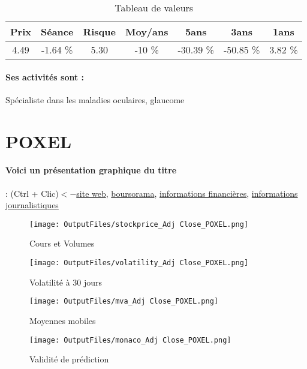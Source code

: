 \documentclass[11pt,a4paper]{report}%
\begin{document}
\begin{table}[H]
  \centering
    \begin{tabular}{|c|c|c|c|c|c|c|}
    \hline
    Prix & Séance & Risque  & Moy/ans & 5ans & 3ans & 1ans \\
    \hline
    4.49 &    -1.64 \%    & 5.30 & -10 \% & -30.39 \% & -50.85 \% & 3.82 \% \\
    \hline
    \end{tabular}%
        \label{tab:table_NICOX}%
      \caption{Tableau de valeurs}
\end{table}%

\paragraph{Ses activités sont : } Spécialiste dans les maladies oculaires, glaucome 
    
    \newpage

\section{POXEL}

\paragraph{Voici un présentation graphique du titre} : (Ctrl + Clic)$<-$\href{https://www.poxelpharma.com/fr/investisseurs/information-des-actionnaires}{site web}, \href{https://www.boursorama.com/cours/1rPPOXEL/}{boursorama}, \href{https://www.qwant.com/?q=site:https:%2f%2fwww.easybourse.com%2faction-societe%2fPOXEL&t=web&client=ext-firefox-hp}{informations financières}, \href{https://bourse.lerevenu.com/cours-de-bourse/fiche-valeur-synthese/POXEL/POXEL-FR}{informations journalistiques}
\begin{figure}[!htb]
   \begin{minipage}{0.5\textwidth}
     \centering
     \texttt{[image: OutputFiles/stockprice\_Adj Close\_POXEL.png]}
     \caption{Cours et Volumes}\label{Fig:price_POXEL}
   \end{minipage}\hfill
   \begin{minipage}{0.5\textwidth}
     \centering
     \texttt{[image: OutputFiles/volatility\_Adj Close\_POXEL.png]}
     \caption{Volatilité à 30 jours}\label{Fig:volat_POXEL}
   \end{minipage}
\end{figure}
\begin{figure}[!htb]
   \begin{minipage}{0.5\textwidth}
     \centering
     \texttt{[image: OutputFiles/mva\_Adj Close\_POXEL.png]}
     \caption{Moyennes mobiles}\label{Fig:mva_POXEL}
   \end{minipage}\hfill
   \begin{minipage}{0.5\textwidth}
     \centering
     \texttt{[image: OutputFiles/monaco\_Adj Close\_POXEL.png]}
     \caption{Validité de prédiction}\label{Fig:prediction_POXEL}
   \end{minipage}
\end{figure}
\end{document}
